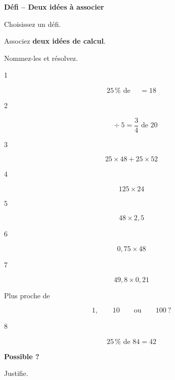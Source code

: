 \documentclass[11pt,a4paper]{article}
\newcommand{\defi}[2]{%
\begin{minipage}[t]{0.242\linewidth}
\begin{cartedefi}{#1}
\centering
#2
\end{cartedefi}
\end{minipage}
}
\begin{document}

\begin{landscape}

\begin{center}

{\sffamily\Large\bfseries\color{DefiC}
Défi -- Deux idées à associer}

\vspace{0.25em}

{\large
Choisissez un défi.

Associez \textbf{deux idées de calcul}.

Nommez-les et résolvez.}

\end{center}

\vspace{0.55cm}


\noindent
\defi{1}{
{\Large
\[
25\,\%\text{ de }\boxed{\phantom{00}}=18
\]
}
}
\hfill
\defi{2}{
{\Large
\[
\boxed{\phantom{00}}\div5
=
\dfrac34\text{ de }20
\]
}
}
\hfill
\defi{3}{
{\Large
\[
25\times48+25\times52
\]
}
}
\hfill
\defi{4}{
{\Large
\[
125\times24
\]
}
}

\vspace{0.45cm}


\noindent
\defi{5}{
{\Large
\[
48\times2{,}5
\]
}
}
\hfill
\defi{6}{
{\Large
\[
0{,}75\times48
\]
}
}
\hfill
\defi{7}{
\large

\[
49{,}8\times0{,}21
\]

\vspace{0.3em}

Plus proche de

\[
1,\qquad10\qquad\text{ou}\qquad100\ ?
\]
}
\hfill
\defi{8}{
\large

\[
25\,\%\text{ de }84=42
\]

\vspace{0.5em}

\textbf{Possible ?}

\vspace{0.2em}

Justifie.
}

\end{landscape}
\end{document}
